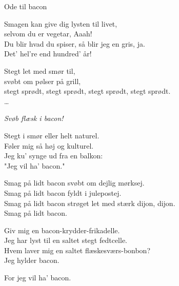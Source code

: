 \begin{song}{Ode til bacon}
  \begin{SBSection*}
    Smagen kan give dig lysten til livet,\\
    selvom du er vegetar, Aaah!\\
    Du blir hvad du spiser, så blir jeg en gris, ja.\\
    Det’ hel’re end hundred’ år!
  \end{SBSection*}

  \begin{SBVerse}
    Stegt let med smør til,\\
    svøbt om pølser på grill,\\
    stegt sprødt, stegt sprødt, stegt sprødt, stegt sprødt.\\
    \ldots
  \end{SBVerse}

  \begin{SBSection*}
    \emph{Svøb flæsk i bacon!}
  \end{SBSection*}

  \begin{SBSection*}
    Stegt i smør eller helt naturel.\\
    Føler mig så høj og kulturel.\\
    Jeg ku’ synge ud fra en balkon:\\
    "Jeg vil ha’ bacon."
  \end{SBSection*}

  \begin{SBChorus}
    Smag på lidt bacon svøbt om dejlig mørksej.\\
    Smag på lidt bacon fyldt i julepostej.\\
    Smag på lidt bacon strøget let med stærk dijon, dijon.\\
    Smag på lidt bacon.
  \end{SBChorus}

  \begin{SBChorus}
    Giv mig en bacon-krydder-frikadelle.\\
    Jeg har lyst til en saltet stegt fedtcelle.\\
    Hvem laver mig en saltet flæskesværs-bonbon?\\
    Jeg hylder bacon.
  \end{SBChorus}

  \begin{SBSection*}
    For jeg vil ha’ bacon.
  \end{SBSection*}
\end{song}